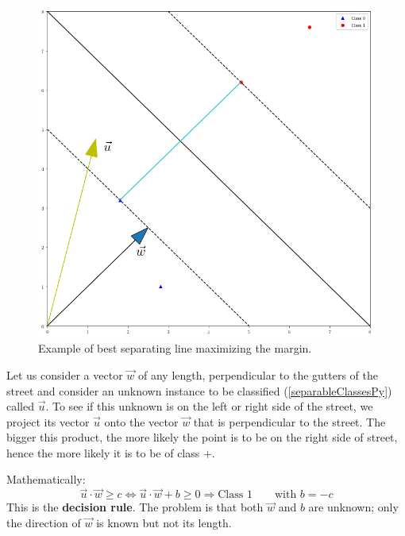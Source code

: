 \documentclass[12pt, letterpaper]{article}
\theoremstyle{definition}
\let\tb\textbf
\begin{document}
\begin{figure}
\centering
\includegraphics[scale=0.4]{img/separableClassesPy}
\caption{Example of best separating line maximizing the margin.}
\label{separableClassesPy}
\end{figure}

Let us consider a vector $\vec{w}$ of any length, perpendicular to the gutters of the street and consider an unknown instance to be classified (\autoref{separableClassesPy}) called $\vec{u}$. To see if this unknown is on the left or right side of the street, we project its vector $\vec{u}$ onto the vector $\vec{w}$ that is perpendicular to the street. The bigger this product, the more likely the point is to be on the right side of street, hence the more likely it is to be of class $+$.

Mathematically:
\begin{equation}
\vec{u}\cdot \vec{w} \ge c \Leftrightarrow \vec{u}\cdot \vec{w} + b \ge0\Rightarrow \text{Class } 1 \quad\quad \text{with } b=-c
\end{equation}
This is the \tb{decision rule}. The problem is that both $\vec{w}$ and $b$ are unknown; only the direction of $\vec{w}$ is known but not its length.
\end{document}
